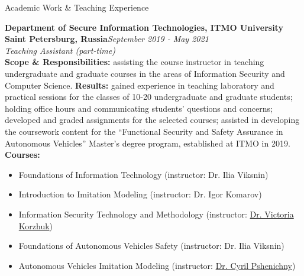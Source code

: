\documentclass[10pt]{resume} %
\begin{document}
\begin{rSection}{Academic Work \& Teaching Experience}


\textbf{Department of Secure Information Technologies, ITMO University}\\
\textbf{Saint Petersburg, Russia}\hfill\small{\em September 2019 - May 2021}\normalsize\\
{\em Teaching Assistant (part-time)}
\\\textbf{Scope \& Responsibilities:} assisting the course instructor in teaching undergraduate and graduate courses in the areas of Information Security and Computer Science. \textbf{Results:} gained experience in teaching laboratory and practical sessions for the classes of 10-20 undergraduate and graduate students; holding office hours and communicating students' questions and concerns; developed and graded assignments for the selected courses; assisted in developing the coursework content for the ``Functional Security and Safety Assurance in Autonomous Vehicles'' Master's degree program, established at ITMO in 2019.
\textbf{Courses:}
\begin{itemize}
\itemsep-0.5em 
    \item Foundations of Information Technology (instructor: Dr. Ilia Viksnin)
    \item Introduction to Imitation Modeling (instructor: Dr. Igor Komarov)
    \item Information Security Technology and Methodology (instructor: \href{https://www.researchgate.net/profile/Viktoria-Korzhuk}{Dr. Victoria Korzhuk})
     \item Foundations of Autonomous Vehicles Safety (instructor: Dr. Ilia Viksnin) 
    \item Autonomous Vehicles Imitation Modeling (instructor: \href{http://geognosis.ifmo.ru/cyril-pshenichny-curriculum-vitae/}{Dr. Cyril Pshenichny})
\end{itemize}


\end{rSection}
\end{document}
